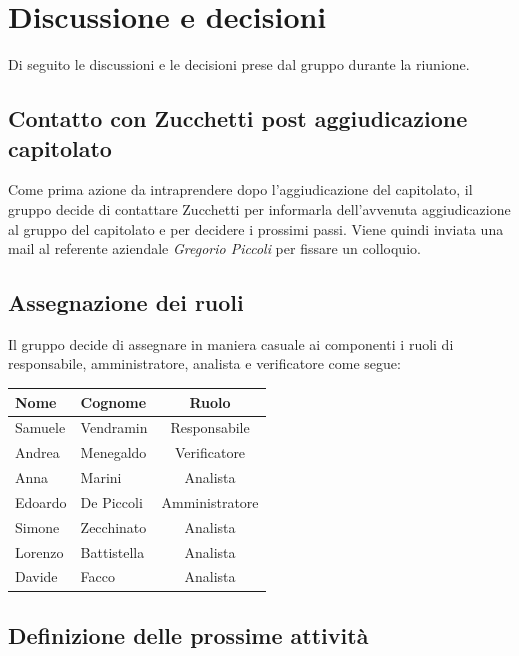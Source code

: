 \documentclass[a4paper, 10pt, colorlinks=true, linkcolor=black, urlcolor=blue, citecolor=blue, hidelinks]{article}
\begin{document}
\section{Discussione e decisioni}
Di seguito le discussioni e le decisioni prese dal gruppo durante la riunione.
\subsection{Contatto con Zucchetti post aggiudicazione capitolato}
Come prima azione da intraprendere dopo l'aggiudicazione del capitolato, il gruppo decide di contattare Zucchetti per informarla dell'avvenuta aggiudicazione al gruppo del capitolato e per decidere i prossimi passi.
Viene quindi inviata una mail al referente aziendale \textit{Gregorio Piccoli} per fissare un colloquio.

\subsection{Assegnazione dei ruoli}
Il gruppo decide di assegnare in maniera casuale ai componenti i ruoli di responsabile, amministratore, analista e verificatore come segue:
\begin{center}
    \begin{tabular}{|l|l|c|}
        \hline
        \textbf{Nome} & \textbf{Cognome} & \textbf{Ruolo} \\
        \hline
        Samuele & Vendramin & Responsabile \\
        \hline
        Andrea & Menegaldo & Verificatore \\
        \hline
        Anna & Marini & Analista \\ 
        \hline
        Edoardo & De Piccoli & Amministratore \\
        \hline
        Simone & Zecchinato & Analista \\
        \hline
        Lorenzo & Battistella & Analista \\
        \hline
        Davide & Facco & Analista \\       
        \hline  
    \end{tabular}
\end{center}

\subsection{Definizione delle prossime attività}
\end{document}
